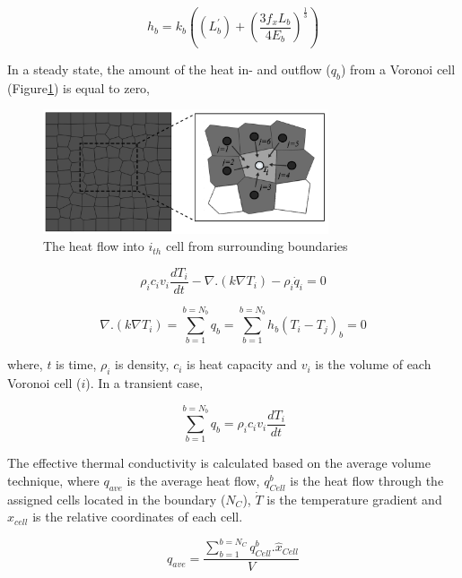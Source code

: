 \begin{equation}
\label{eq:LEM_Thermal_1}
h_b = k_{b} \left( (L_b^\prime)+ \left(\frac{3f_x L_b}{4E_b}\right)^\frac{1}{3} \right)
\end{equation}

In a steady state, the amount of the heat in- and outflow ($q_b$) from a Voronoi cell (Figure\ref{fig:Amir_LEM_Thermal}) is equal to zero,

\begin{figure}[!ht]
\centering
\includegraphics[width=0.75\textwidth]{figures/Amir_LEM_Thermal.png}
\caption{The heat flow into $i_{th}$ cell from surrounding boundaries}
\label{fig:Amir_LEM_Thermal}
\end{figure}


\begin{equation}
\label{eq:LEM_Thermal_2}
\rho_{i}c_{i}v_{i}\frac{dT_{i}}{dt}-\nabla .\left(k\nabla T_i\right)-\rho_i{\dot{q}}_i=0
\end{equation}

\begin{equation}
\label{eq:LEM_Thermal_3}
\nabla .\left(k\nabla T_i\right)=\sum_{b=1}^{b=N_b}{q_b}=\sum_{b=1}^{b=N_b}{h_b(T_i - T_j)_b=0}
\end{equation}

 
where, $t$ is time, $\rho_{i}$ is density, $c_{i}$ is heat capacity and $v_{i}$ is the volume of each Voronoi cell ($i$). In a transient case,

\begin{equation}
\label{eq:LEM_Thermal_4}
\sum_{b=1}^{b=N_b}{q_b=}\rho_{i}c_{i}v_{i}\frac{dT_i}{dt}
\end{equation}

The effective thermal conductivity is calculated based on the average volume technique, where $q_{ave}$ is the average heat flow, $q_{Cell}^{b}$ is the heat flow through the assigned cells located in the boundary ($N_C$), $\dot{T}$ is the temperature gradient and  $\hat{x}_{cell}$ is the relative coordinates of each cell.

\begin{equation}
\label{eq:LEM_Thermal_5}
q_{ave}=\frac{\sum_{b=1}^{b=N_C}q_{Cell}^b.\hat{x}_{Cell}}{V}
\end{equation}

